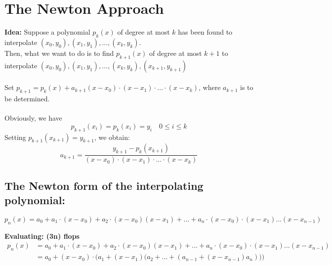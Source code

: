 \documentclass [9 pt]{article}
\theoremstyle{definition}
\begin{document}
\section*{The Newton Approach}

\textbf{Idea:} 
Suppose a polynomial $p_k(x)$ of degree at most $k$ has been found to interpolate $(x_0, y_0), (x_1, y_1), \ldots , (x_k, y_k)$.\\
Then, what we want to do is to find $p_{k+1}(x)$ of degree at most $k + 1$ to interpolate  $(x_0, y_0), (x_1, y_1), \ldots , (x_k, y_k), (x_{k+1}, y_{k+1})$\\
\\
Set $p_{k+1} = p_k(x) + a_{k+1} (x- x_0) \cdot(x - x_1) \cdot \ldots \cdot (x- x_k) $, where $a_{k+1}$ is to be determined.\\
\\
Obviously, we have 
$$ p_{k+1}(x_i) = p_{k}(x_i) = y_i \quad 0 \leq i \leq k $$
Setting $p_{k+1}(x_{k+1}) = y_{k+1} $, we obtain:
$$a_{k+1} = \dfrac{y_{k+1} - p_k(x_{k+1})}{ (x- x_0) \cdot(x - x_1) \cdot \ldots \cdot (x- x_k) }$$
\subsection*{The Newton form of the interpolating polynomial:}
$$p_n(x) = a_0 + a_1 \cdot (x - x_0) + a_2\cdot (x  - x_0)(x - x_1) + \ldots +a_n \cdot (x - x_0) \cdot (x - x_1) \ldots (x - x_{n - 1}) $$

\newpage
\textbf{Evaluating: (3n) flops}
\begin{align*}
	p_n(x) 
	&= a_0 + a_1 \cdot (x - x_0) + a_2\cdot (x  - x_0)(x - x_1) + \ldots +a_n \cdot (x - x_0) \cdot (x - x_1) \ldots (x - x_{n - 1}) \\
	&= a_0 +  (x - x_0) \cdot \bigg( a_1 + ( x - x_1) \Big( a_2 +  \ldots + ( a_{n - 1} + (x - x_{n - 1}) a_n) \Big) \bigg)
\end{align*}
\end{document}
